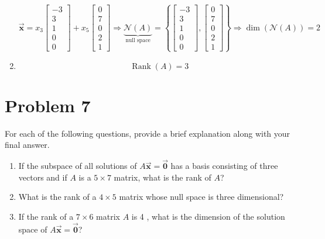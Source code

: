 \documentclass[letter,11pt]{article}
\theoremstyle{definition}
\begin{document}
\begin{tcolorbox}[boxrule=1mm, width=(.9\linewidth),before=\hfill,after=\hfill,adjusted title={Problem 6 Solutions}]
\begin{enumerate}[label = \roman*.]
 $$\vec{\boldsymbol{x}} = x_{3}\begin{bmatrix}-3\\3\\1\\0\\0 \end{bmatrix}+ x_{5}\begin{bmatrix}0\\7\\0\\2\\1 \end{bmatrix} \Longrightarrow \underbrace{\mathcal{N}(A)}_{\text{null space}}=\left\{\begin{bmatrix}-3\\3\\1\\0\\0 \end{bmatrix},\begin{bmatrix}0\\7\\0\\2\\1 \end{bmatrix} \right\} \Longrightarrow \operatorname{dim}(\mathcal{N}(A)) = 2 $$
 \item $$\operatorname{Rank} (A) = 3$$
\end{enumerate}
\end{tcolorbox}

\newpage
\section{Problem 7}
For each of the following questions, provide a brief explanation along with your final answer.

\begin{enumerate}[label = \roman*.]
    \item If the subspace of all solutions of $A \vec{\boldsymbol{x}}=\vec{\boldsymbol{0}}$ has a basis consisting of three vectors and if $A$ is a $5 \times 7$ matrix, what is the rank of $A$?
    \item What is the rank of a $4 \times 5$ matrix whose null space is three dimensional?
    \item  If the rank of a $7 \times 6$ matrix $A$ is 4 , what is the dimension of the solution space of $A \vec{\boldsymbol{x}}=\vec{\boldsymbol{0}}$?
\end{enumerate}
\end{document}
